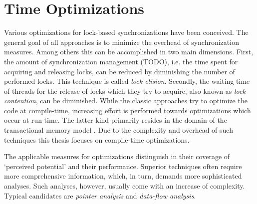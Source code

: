 \section{Time Optimizations}
Various optimizations for lock-based synchronizations have been conceived. The general goal of all approaches is to minimize the overhead of synchronization measures. Among others this can be accomplished in two main dimensions. First, the amount of synchronization management (TODO), i.e. the time spent for acquiring and releasing locks, can be reduced by diminishing the number of performed locks. This technique is called \textit{lock elision}. Secondly, the waiting time of threads for the release of locks which they try to acquire, also known as \textit{lock contention}, can be diminished. While the classic approaches try to optimize the code at compile-time, increasing effort is performed towards optimizations which occur at run-time. The latter kind primarily resides in the domain of the transactional memory model \cite{SpeculativeLockElision}\cite{ARuntimeSystem}. Due to the complexity and overhead of such techniques this thesis focuses on compile-time optimizations.

The applicable measures for optimizations distinguish in their coverage of `perceived potential' and their performance. Superior techniques often require more comprehensive information, which, in turn, demands more sophisticated analyses. Such analyses, however, usually come with an increase of complexity. Typical candidates are \textit{pointer analysis} and \textit{data-flow analysis}.

